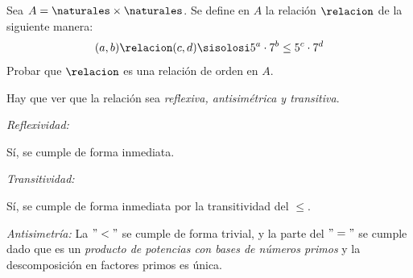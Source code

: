 \begin{enunciado}{\ejExtra[parcial 18/2/26]}

  Sea $A = \naturales \times \naturales$. Se define en $A$ la relación $\relacion$ de la siguiente manera:
  $$
    (a,b) \relacion (c,d) \sisolosi 5^a \cdot 7^b \leq 5^c \cdot 7^d
  $$
  Probar que $\relacion$ es una relación de orden en $A$.
\end{enunciado}

Hay que ver que la relación sea \textit{reflexiva, antisimétrica y transitiva}.

\bigskip

\textit{Reflexividad:}

Sí, se cumple de forma inmediata.

\bigskip

\textit{Transitividad:}

Sí, se cumple de forma inmediata por la transitividad del $\leq$.

\bigskip

\textit{Antisimetría:}
La $"<"$ se cumple de forma trivial, y la parte del $"="$ se cumple dado que es un
\textit{producto de potencias con bases de números primos} y la descomposición en factores primos es única.

\begin{aportes}
  \item {}
\end{aportes}
